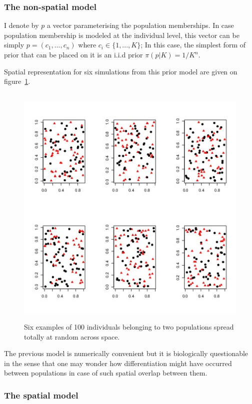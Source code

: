 \documentclass[a4paper,10pt]{article}
\begin{document}
\subsubsection{The non-spatial model}
I denote by  $p$ a vector parameterising the  population memberships. 
In case population membership is modeled at the individual level, this vector can be simply $p=(c_1,...,c_n)$ 
where $c_i \in \{1,...,K\}$; In this case, the simplest form of prior that can be placed on it is an i.i.d prior $\pi(p|K) = 1/K^n$. 

Spatial representation for six simulations from this prior model are given on figure~\ref{fig:nonspaprior}.

\begin{figure}[h]
\includegraphics[height=12cm,width=17cm]{./fig/example_spatial_bis.jpeg}
\caption{Six examples of 100 individuals belonging to two populations spread totally at random across space.}\label{fig:nonspaprior}
\end{figure}

The previous model is numerically convenient but it is biologically questionable in the sense that one may wonder how differentiation 
might have occurred between populations in case of such spatial overlap between them.


\subsubsection{The spatial model}
\end{document}
